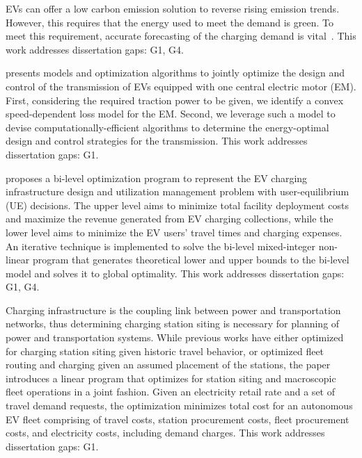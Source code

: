 \documentclass[letterpaper, 12pt, oneside, doublespacing]{Thesis}
\begin{document}
\noindent EVs can offer a low carbon emission solution to reverse rising emission trends. However, this requires that the energy used to meet the demand is green. To meet this requirement, accurate forecasting of the charging demand is vital~\cite{deep_spatio-temporal_2021}. This work addresses dissertation gaps: G1, G4.



\noindent \cite{energy-optimal_design_2021} presents models and optimization algorithms to jointly optimize the design and control of the transmission of EVs equipped with one central electric motor (EM). First, considering the required traction power to be given, we identify a convex speed-dependent loss model for the EM. Second, we leverage such a model to devise computationally-efficient algorithms to determine the energy-optimal design and control strategies for the transmission. This work addresses dissertation gaps: G1.



\noindent \cite{hierarchical_optimization_2021} proposes a bi-level optimization program to represent the EV charging infrastructure design and utilization management problem with user-equilibrium (UE) decisions. The upper level aims to minimize total facility deployment costs and maximize the revenue generated from EV charging collections, while the lower level aims to minimize the EV users' travel times and charging expenses. An iterative technique is implemented to solve the bi-level mixed-integer non-linear program that generates theoretical lower and upper bounds to the bi-level model and solves it to global optimality. This work addresses dissertation gaps: G1, G4.



\noindent Charging infrastructure is the coupling link between power and transportation networks, thus determining charging station siting is necessary for planning of power and transportation systems. While previous works have either optimized for charging station siting given historic travel behavior, or optimized fleet routing and charging given an assumed placement of the stations, the paper \cite{joint_optimization_2021} introduces a linear program that optimizes for station siting and macroscopic fleet operations in a joint fashion. Given an electricity retail rate and a set of travel demand requests, the optimization minimizes total cost for an autonomous EV fleet comprising of travel costs, station procurement costs, fleet procurement costs, and electricity costs, including demand charges. This work addresses dissertation gaps: G1.
\end{document}
